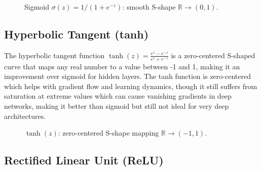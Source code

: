 \begin{figure}[htbp]
\centering
{}
\caption{Sigmoid $\sigma(z)=1/(1+e^{-z})$: smooth S-shape $\mathbb{R}\to(0,1)$.}
\label{fig:sigmoid-plot}
\end{figure}

\subsection{Hyperbolic Tangent (tanh)}

The hyperbolic tangent function $\tanh(z) = \frac{e^z - e^{-z}}{e^z + e^{-z}}$ is a zero-centered S-shaped curve that maps any real number to a value between -1 and 1, making it an improvement over sigmoid for hidden layers. The tanh function is zero-centered which helps with gradient flow and learning dynamics, though it still suffers from saturation at extreme values which can cause vanishing gradients in deep networks, making it better than sigmoid but still not ideal for very deep architectures.

\begin{figure}[htbp]
\centering
{}
\caption{$\tanh(z)$: zero-centered S-shape mapping $\mathbb{R}\to(-1,1)$.}
\label{fig:tanh-plot}
\end{figure}

\subsection{Rectified Linear Unit (ReLU)}


